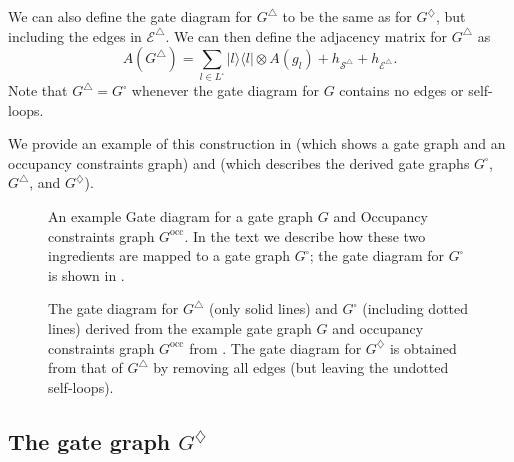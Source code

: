 \documentclass[../thesis-main/thesis-main]{subfiles}
\begin{document}
We can also define the gate diagram for $G^{\triangle}$ to be the same as for $G^{\diamondsuit}$, but including the edges in $\mathcal{E}^{\triangle}$.  We can then define the adjacency matrix for $G^{\triangle}$ as
\begin{equation}
  A(G^{\triangle})=\sum_{l\in L^{\square}}|l\rangle\langle l|\otimes A(g_{l})+h_{\mathcal{S}^{\triangle}}+h_{\mathcal{E}^{\triangle}}.\label{eq:A_g_triangle}
\end{equation}
Note that $G^{\triangle}=G^{\square}$ whenever the gate diagram for $G$ contains no edges or self-loops. 


We provide an example of this construction in  (which shows a gate graph and an occupancy constraints graph) and  (which describes the derived gate graphs $G^{\square}$, $G^{\triangle}$, and $G^{\diamondsuit}$).


\begin{figure}
\centering
{}
\hspace{4cm}
\caption{An example  Gate diagram for a gate graph $G$ and  Occupancy constraints graph $G^{\text{occ}}$. In the text we describe how these two ingredients are mapped to a gate graph $G^{\square}$; the gate diagram for $G^{\square}$ is shown in .\label{fig:example_G_Gtilde}}
\end{figure}

\begin{figure}
  
\caption{The gate diagram for $G^{\triangle}$ (only solid lines) and $G^{\square}$ (including dotted lines) derived from the example gate graph $G$ and occupancy constraints graph $G^{\text{occ}}$ from . The gate diagram for $G^{\diamondsuit}$ is obtained from that of $G^{\triangle}$ by removing all edges (but leaving the undotted self-loops).\label{fig:big_example_G_square}}
\end{figure}


\subsection{The gate graph $G^{\diamondsuit}$}
\label{sec:The-gate-graph_G_DIAMOND}
\end{document}
